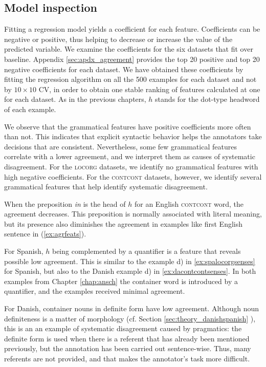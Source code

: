 \documentclass[11pt,a4paper]{article}
\begin{document}
\subsection{Model inspection}
Fitting a regression model yields a coefficient for each feature. Coefficients can be negative or positive, thus helping to decrease or increase the value of the predicted variable. We examine the coefficients for the six datasets that fit over baseline.  Appendix \ref{sec:apdx_agreement} provides the top 20  positive and top 20 negative coefficients for each dataset. We have obtained these coefficients by fitting the regression algorithm on all the 500 examples for each dataset and not by $10\times10$ CV, in order to obtain one stable ranking of features calculated at one for each dataset.  As in the previous chapters, $h$ stands for the dot-type headword of each example.

We observe that the grammatical features have positive coefficients more often than not. This indicates that explicit syntactic behavior helps the annotators take decisions that are consistent. Nevertheless, some few grammatical features correlate with a lower agreement, and we interpret them as causes of systematic disagreement. For the \textsc{locorg} datasets, we identify no grammatical features with high negative coefficients. For the \textsc{contcont} datasets, however, we identify several grammatical features that help identify systematic disagreement.

When the preposition \textit{in} is the head of $h$ for an English \textsc{contcont} word, the agreement decreases. This preposition is normally associated with literal meaning, but its presence also diminishes the agreement in examples like first English sentence in (\ref{ex:agrfeats}).

For Spanish, $h$ being complemented by a quantifier is a feature that reveals possible low agreement. This is similar to the example d) in \ref{ex:spalocorgsenses} for Spanish, but also to the Danish example d) in  \ref{ex:dacontcontsenses}. In both examples from Chapter \ref{chap:ansch} the container word is introduced by a quantifier, and the examples received minimal agreement. 
 
For Danish, container nouns in definite form have low agreement. Although noun definiteness is a matter of morphology (cf. Section \ref{sec:theory_danishspanish}
), this is an an example of systematic disagreement caused by pragmatics: the definite form is used when there is a referent that has already been mentioned previously, but the annotation has been carried out sentence-wise. Thus, many referents are not provided, and that makes the annotator's task more difficult. 
\end{document}
